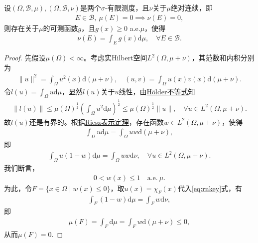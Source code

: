 \documentclass[../../main.tex]{subfiles}%
\begin{document}
\begin{theorem}\label{theorem:泛函分析--Radon-Nikodym定理}
设$(\Omega,\mathcal{B},\mu),(\Omega,\mathcal{B},\nu)$是两个$\sigma$-有限测度，且$\nu$关于$\mu$绝对连续，即
\begin{align*}
E\in\mathcal{B},\ \mu(E)=0\implies\nu(E)=0,
\end{align*}
则存在关于$\mu$的可测函数$g$，且$g(x)\geqslant 0$ a.e.$\mu$，使得
\begin{align*}
\nu(E)=\int_E g(x)\mathrm{d}\mu,\quad \forall E\in\mathcal{B}.
\end{align*}
\end{theorem}
\begin{proof}
先假设$\mu(\Omega)<\infty$。考虑实Hilbert空间$L^2(\Omega,\mu+\nu)$，其范数和内积分别为
\begin{align*}
\|u\|^2=\int_\Omega u^2(x)\mathrm{d}(\mu+\nu),\quad (u,v)=\int_\Omega u(x)v(x)\mathrm{d}(\mu+\nu).
\end{align*}
令$l(u)=\int_\Omega u\mathrm{d}\mu$，显然$l(u)$关于$u$线性，由\hyperref[Real Analysis-theorem:实变函数--Hölder不等式]{Hölder不等式}知
\begin{align*}
\|l(u)\|\leqslant\mu(\Omega)^{\frac{1}{2}}\left(\int_\Omega u^2\mathrm{d}\mu\right)^{\frac{1}{2}}
\leqslant\mu(\Omega)^{\frac{1}{2}}\|u\|,\quad \forall u\in L^2(\Omega,\mu+\nu).
\end{align*}
故$l(u)$还是有界的。根据\hyperref[theorem:Riesz表示定理(Hilbert空间)]{Riesz表示定理}，存在函数$w\in L^2(\Omega,\mu+\nu)$，使得
\begin{align*}
\int_\Omega u\mathrm{d}\mu=\int_\Omega uw\mathrm{d}(\mu+\nu),
\end{align*}
即
\begin{align}
\int_\Omega u(1-w)\mathrm{d}\mu=\int_\Omega uw\mathrm{d}\nu,\quad \forall u\in L^2(\Omega,\mu+\nu).
\label{eq:rnkey}
\end{align}
我们断言，
\begin{align*}
0<w(x)\leqslant 1\quad \text{a.e.}\ \mu.
\end{align*}
为此，令$F=\{x\in\Omega\mid w(x)\leqslant 0\}$，取$u(x)=\chi_F(x)$代入\eqref{eq:rnkey}式，有
\begin{align*}
\int_F (1-w)\mathrm{d}\mu=\int_F w\mathrm{d}\nu,
\end{align*}
即
\begin{align*}
\mu(F)=\int_F \mathrm{d}\mu=\int_F w\mathrm{d}(\mu+\nu)\leqslant 0,
\end{align*}
从而$\mu(F)=0$.


\end{proof}
\end{document}
